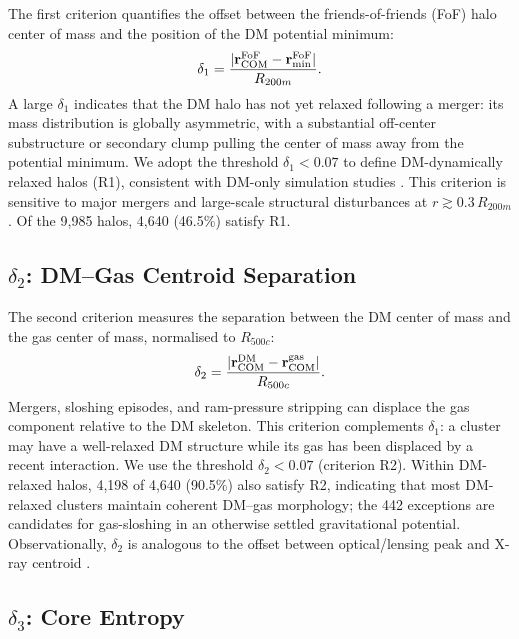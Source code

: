 \documentclass[12pt]{article}
\newcommand{\Rfive}{R_{500c}}
\newcommand{\Rtwo}{R_{200m}}
\newcommand{\deltai}{\delta_1}
\newcommand{\deltaii}{\delta_2}
\newcommand{\deltaiii}{\delta_3}
\begin{document}
The first criterion quantifies the offset between the friends-of-friends (FoF) halo
center of mass and the position of the DM potential minimum:
\begin{equation}
  \deltai = \frac{|\mathbf{r}_{\rm COM}^{\rm FoF} - \mathbf{r}_{\rm min}^{\rm FoF}|}{R_{200m}}.
\end{equation}
A large $\deltai$ indicates that the DM halo has not yet relaxed following a merger:
its mass distribution is globally asymmetric, with a substantial off-center substructure
or secondary clump pulling the center of mass away from the potential minimum.
We adopt the threshold $\deltai < 0.07$ to define DM-dynamically relaxed halos (R1),
consistent with DM-only simulation studies \citep{neto2007}.
This criterion is sensitive to major mergers and large-scale structural disturbances
at $r \gtrsim 0.3\,\Rtwo$.  Of the 9{,}985 halos, 4{,}640 (46.5\%) satisfy R1.

\subsection{\texorpdfstring{$\deltaii$}{delta2}: DM--Gas Centroid Separation}

The second criterion measures the separation between the DM center of mass and the gas
center of mass, normalised to $\Rfive$:
\begin{equation}
  \deltaii = \frac{|\mathbf{r}_{\rm COM}^{\rm DM} - \mathbf{r}_{\rm COM}^{\rm gas}|}{R_{500c}}.
\end{equation}
Mergers, sloshing episodes, and ram-pressure stripping can displace the gas component
relative to the DM skeleton.  This criterion complements $\deltai$: a cluster may have a
well-relaxed DM structure while its gas has been displaced by a recent interaction.
We use the threshold $\deltaii < 0.07$ (criterion R2).  Within DM-relaxed halos,
4{,}198 of 4{,}640 (90.5\%) also satisfy R2, indicating that most DM-relaxed clusters
maintain coherent DM--gas morphology; the 442 exceptions are candidates for gas-sloshing
in an otherwise settled gravitational potential.
Observationally, $\deltaii$ is analogous to the offset between optical/lensing peak and
X-ray centroid \citep{cassano2010}.

\subsection{\texorpdfstring{$\deltaiii$}{delta3}: Core Entropy}
\end{document}
